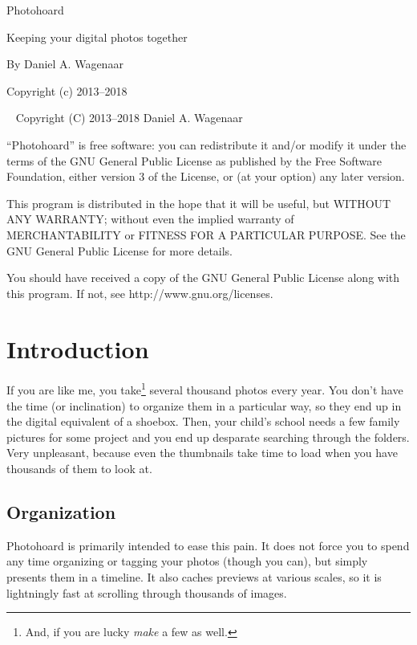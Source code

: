\documentclass[11pt]{report}
\begin{document}
\thispagestyle{empty}
\begin{centering}
  {\Huge Photohoard}
  \vskip30pt

  {\Large Keeping your digital photos together}
  \vskip60pt

  {\large By Daniel A. Wagenaar}
  \vfill
  
  {Copyright (c) 2013--2018}
  
\end{centering}
\pagebreak
~
\vfill
\noindent Copyright (C) 2013--2018 Daniel A. Wagenaar\medskip

``Photohoard'' is free software: you can redistribute it and/or modify
it under the terms of the GNU General Public License as published by
the Free Software Foundation, either version 3 of the License, or
(at your option) any later version.

This program is distributed in the hope that it will be useful,
but WITHOUT ANY WARRANTY; without even the implied warranty of
MERCHANTABILITY or FITNESS FOR A PARTICULAR PURPOSE.  See the
GNU General Public License for more details.

You should have received a copy of the GNU General Public License
along with this program.  If not, see http://www.gnu.org/licenses.
\pagebreak

\chapter{Introduction}

If you are like me, you take\footnote{And, if you are lucky
  \emph{make} a few as well.} several thousand photos every year. You
don't have the time (or inclination) to organize them in a particular
way, so they end up in the digital equivalent of a shoebox. Then, your
child's school needs a few family pictures for some project and you
end up desparate searching through the folders. Very unpleasant,
because even the thumbnails take time to load when you have thousands
of them to look at.

\section{Organization}

Photohoard is primarily intended to ease this pain. It does not force
you to spend any time organizing or tagging your photos (though you
can), but simply presents them in a timeline. It also caches
previews at various scales, so it is lightningly fast at scrolling
through thousands of images.
\end{document}
